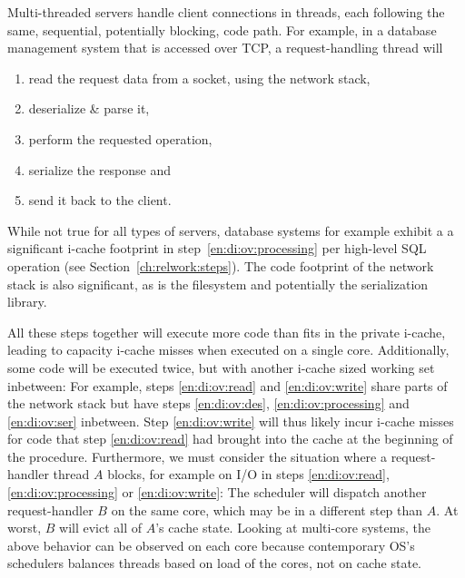 \documentclass[12pt,a4paper]{book}
\begin{document}
Multi-threaded servers handle client connections in threads, each following the same, sequential, potentially blocking, code path.
For example, in a database management system that is accessed over TCP, a request-handling thread will
\begin{enumerate}[label=(\alph*)]
    \item read the request data from a socket, using the network stack, \label{en:di:ov:read}
    \item deserialize \& parse it, \label{en:di:ov:des}
    \item perform the requested operation,\label{en:di:ov:processing}
    \item serialize the response and \label{en:di:ov:ser}
    \item send it back to  the client. \label{en:di:ov:write}
\end{enumerate}
While not true for all types of servers, database systems for example exhibit a a significant i-cache footprint in step~\ref{en:di:ov:processing} per high-level SQL operation (see Section~\ref{ch:relwork:steps}).
The code footprint of the network stack is also significant, as is the filesystem and potentially the serialization library.

All these steps together will execute more code than fits in the private i-cache, leading to capacity i-cache misses when executed on a single core.
Additionally, some code will be executed twice, but with another i-cache sized working set inbetween:
For example, steps \ref{en:di:ov:read} and \ref{en:di:ov:write} share parts of the network stack but have steps \ref{en:di:ov:des}, \ref{en:di:ov:processing} and \ref{en:di:ov:ser} inbetween.
Step \ref{en:di:ov:write} will thus likely incur i-cache misses for code that step \ref{en:di:ov:read} had brought into the cache at the beginning of the procedure.
Furthermore, we must consider the situation where a request-handler thread $A$ blocks, for example on I/O in steps \ref{en:di:ov:read}, \ref{en:di:ov:processing} or \ref{en:di:ov:write}:
The scheduler will dispatch another request-handler $B$ on the same core, which may be in a different step than $A$.
At worst, $B$ will evict all of $A$'s cache state.
Looking at multi-core systems, the above behavior can be observed on each core because contemporary OS's schedulers balances threads based on load of the cores, not on cache state.
\end{document}
